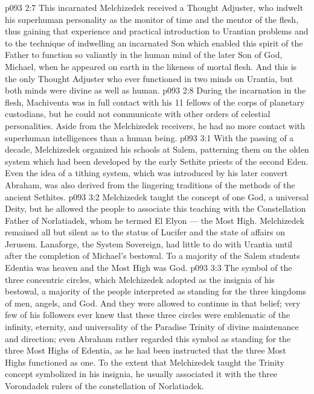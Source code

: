 \vs p093 2:7 \pc This incarnated Melchizedek received a Thought Adjuster, who indwelt his superhuman personality as the monitor of time and the mentor of the flesh, thus gaining that experience and practical introduction to Urantian problems and to the technique of indwelling an incarnated Son which enabled this spirit of the Father to function so valiantly in the human mind of the later Son of God, Michael, when he appeared on earth in the likeness of mortal flesh. And this is the only Thought Adjuster who ever functioned in two minds on Urantia, but both minds were divine as well as human.
\vs p093 2:8 During the incarnation in the flesh, Machiventa was in full contact with his 11 fellows of the corps of planetary custodians, but he could not communicate with other orders of celestial personalities. Aside from the Melchizedek receivers, he had no more contact with superhuman intelligences than a human being.
\vs p093 3:1 With the passing of a decade, Melchizedek organized his schools at Salem, patterning them on the olden system which had been developed by the early Sethite priests of the second Eden. Even the idea of a tithing system, which was introduced by his later convert Abraham, was also derived from the lingering traditions of the methods of the ancient Sethites.
\vs p093 3:2 Melchizedek taught the concept of one God, a universal Deity, but he allowed the people to associate this teaching with the Constellation Father of Norlatiadek, whom he termed El Elyon --- the Most High. Melchizedek remained all but silent as to the status of Lucifer and the state of affairs on Jerusem. Lanaforge, the System Sovereign, had little to do with Urantia until after the completion of Michael’s bestowal. To a majority of the Salem students Edentia was heaven and the Most High was God.
\vs p093 3:3 The symbol of the three concentric circles, which Melchizedek adopted as the insignia of his bestowal, a majority of the people interpreted as standing for the three kingdoms of men, angels, and God. And they were allowed to continue in that belief; very few of his followers ever knew that these three circles were emblematic of the infinity, eternity, and universality of the Paradise Trinity of divine maintenance and direction; even Abraham rather regarded this symbol as standing for the three Most Highs of Edentia, as he had been instructed that the three Most Highs functioned as one. To the extent that Melchizedek taught the Trinity concept symbolized in his insignia, he usually associated it with the three Vorondadek rulers of the constellation of Norlatiadek.
